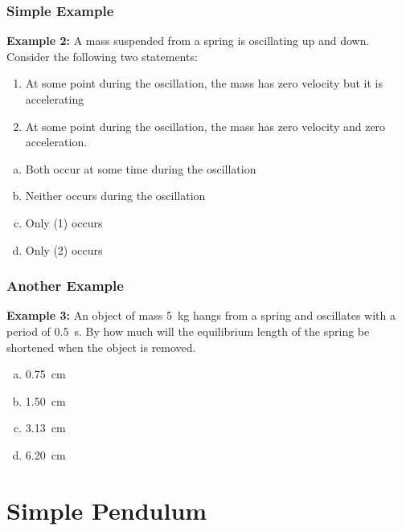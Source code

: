 \documentclass[12pt,compress,aspectratio=169]{beamer}
\begin{document}


\begin{frame}
  \frametitle{Simple Example}
  \textbf{Example 2:} A mass suspended from a spring is oscillating up and
  down. Consider the following two statements:
  \begin{enumerate}
  \item At some point during the oscillation, the mass has zero velocity but it
    is accelerating
  \item At some point during the oscillation, the mass has zero velocity and
    zero acceleration.
  \end{enumerate}

  \begin{enumerate}[(a)]
  \item Both occur at some time during the oscillation
  \item Neither occurs during the oscillation
  \item Only (1) occurs
  \item Only (2) occurs
  \end{enumerate}
\end{frame}



\begin{frame}
  \frametitle{Another Example}
  \textbf{Example 3:} An object of mass \SI{5}{\kg} hangs from a spring and
  oscillates with a period of \SI{0.5}{\second}. By how much will the
  equilibrium length of the spring be shortened when the object is removed.
  \begin{enumerate}[(a)]
  \item\SI{0.75}{\centi\metre}
  \item\SI{1.50}{\centi\metre}
  \item\SI{3.13}{\centi\metre}
  \item\SI{6.20}{\centi\metre}
  \end{enumerate}
\end{frame}



\section{Simple Pendulum}
\end{document}
